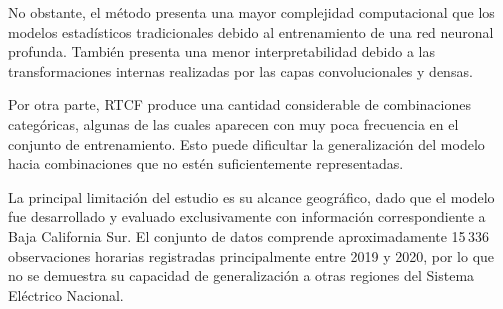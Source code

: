 No obstante, el método presenta una mayor complejidad computacional
que los modelos estadísticos tradicionales debido al entrenamiento
de una red neuronal profunda. También presenta una menor
interpretabilidad debido a las transformaciones internas realizadas
por las capas convolucionales y densas.

Por otra parte, RTCF produce una cantidad considerable de
combinaciones categóricas, algunas de las cuales aparecen con muy
poca frecuencia en el conjunto de entrenamiento. Esto puede
dificultar la generalización del modelo hacia combinaciones que no
estén suficientemente representadas.

La principal limitación del estudio es su alcance geográfico, dado
que el modelo fue desarrollado y evaluado exclusivamente con
información correspondiente a Baja California Sur. El conjunto de
datos comprende aproximadamente 15\,336 observaciones horarias
registradas principalmente entre 2019 y 2020, por lo que no se
demuestra su capacidad de generalización a otras regiones del
Sistema Eléctrico Nacional.